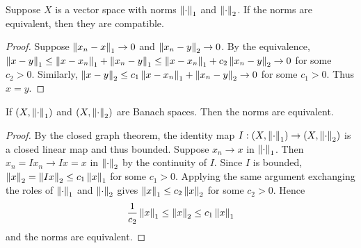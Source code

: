 \begin{proposition}\label{prop:equiv_compatible}
    Suppose $X$ is a vector space with norms $\left\lVert {\cdot} \right\rVert_1$ and $\left\lVert {\cdot} \right\rVert_2$. 
    If the norms are equivalent, then they are compatible.
\end{proposition}
\begin{proof}
    Suppose $\left\lVert {x_n-x} \right\rVert_1\to 0$ and $\left\lVert {x_n-y} \right\rVert_2\to 0$. By the equivalence, 
    $\left\lVert {x-y} \right\rVert_1\leq \left\lVert {x-x_n} \right\rVert_1 + \left\lVert {x_n-y} \right\rVert_1\leq \left\lVert {x-x_n} \right\rVert_1 + c_2\left\lVert {x_n-y} \right\rVert_2\to 0$ 
    for some $c_2>0$. Similarly, $\left\lVert {x-y} \right\rVert_2\leq c_1\left\lVert {x-x_n} \right\rVert_1 + \left\lVert {x_n-y} \right\rVert_2\to 0$ 
    for some $c_1>0$. Thus $x=y$.
\end{proof}

\begin{proposition}
    If $(X,\left\lVert {\cdot} \right\rVert_1)$ and $(X,\left\lVert {\cdot} \right\rVert_2)$ are Banach spaces. Then 
    the norms are equivalent.
\end{proposition}
\begin{proof}
    By the closed graph theorem, the identity map $I:(X,\left\lVert {\cdot} \right\rVert_1)\to(X,\left\lVert {\cdot} \right\rVert_2)$ 
    is a closed linear map and thus bounded. Suppose $x_n\to x$ in $\left\lVert {\cdot} \right\rVert_1$. 
    Then $x_n = Ix_n\to Ix = x$ in $\left\lVert {\cdot} \right\rVert_2$ by the continuity of $I$. Since 
    $I$ is bounded, $\left\lVert {x} \right\rVert_2 = \left\lVert {Ix} \right\rVert_2 \leq c_1\left\lVert {x} \right\rVert_1$ for some $c_1>0$. 
    Applying the same argument exchanging the roles of $\left\lVert {\cdot} \right\rVert_1$ and $\left\lVert {\cdot} \right\rVert_2$ 
    gives $\left\lVert {x} \right\rVert_1 \leq c_2\left\lVert {x} \right\rVert_2$ for some $c_2>0$. Hence 
    \begin{equation*}
        \frac{1}{c_2}\left\lVert {x} \right\rVert_1 \leq \left\lVert {x} \right\rVert_2 \leq c_1\left\lVert {x} \right\rVert_1
    \end{equation*}
    and the norms are equivalent.
\end{proof}
